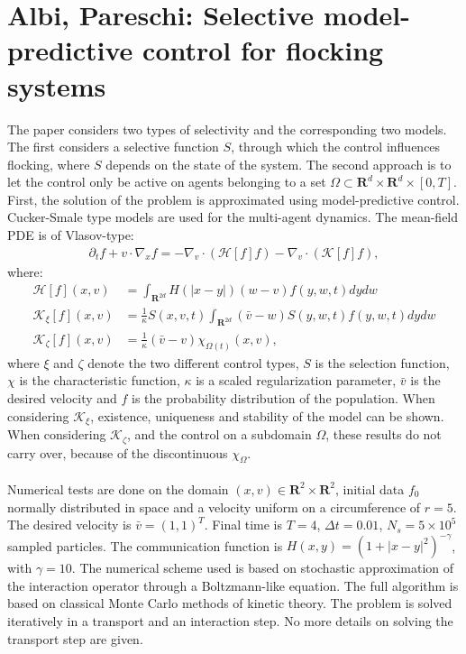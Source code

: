 \documentclass[11pt, a4paper]{article}
\theoremstyle{definition}
\begin{document}
\section{Albi, Pareschi: Selective model-predictive control for flocking systems \cite{albi2016selective}}
The paper considers two types of selectivity and the corresponding two models. The first considers a selective function $S$, through which the control influences flocking, where $S$ depends on the state of the system. The second approach is to let the control only be active on agents belonging to a set $\Omega \subset \mathbf{R}^d \times \mathbf{R}^d \times [0,T]$.\\
First, the solution of the problem is approximated using model-predictive control. Cucker-Smale type models are used for the multi-agent dynamics.
The mean-field PDE is of Vlasov-type:
\begin{align*}
\partial_t f + v \cdot\nabla_x f = - \nabla_v \cdot (\mathcal{H}[f]f)- \nabla_v \cdot (\mathcal{K}[f]f),
\end{align*}
where:
\begin{align*}
\mathcal{H}[f](x,v) &= \int_{\mathbf{R}^{2d}} H(|x-y|)(w-v)f(y,w,t)dy dw\\
\mathcal{K}_\xi[f](x,v) &= \frac{1}{\kappa}S(x,v,t) \int_{\mathbf{R}^{2d}} (\bar v - w) S(y,w,t)f(y,w,t) dy dw\\
\mathcal{K}_\zeta [f](x,v) &= \frac{1}{\kappa}(\bar v - v ) \chi_{\Omega(t)}(x,v),
\end{align*}
where $\xi$ and $\zeta$ denote the two different control types, $S$ is the selection function, $\chi$ is the characteristic function, $\kappa$ is a scaled regularization parameter, $\bar v$ is the desired velocity and $f$ is the probability distribution of the population.
When considering $\mathcal{K}_\xi$, existence, uniqueness and stability of the model can be shown. When considering $\mathcal{K}_\zeta$, and the control on a subdomain $\Omega$, these results do not carry over, because of the discontinuous $\chi_\Omega$.\\
\\
Numerical tests are done on the domain $(x,v) \in \mathbf{R}^2 \times \mathbf{R}^2$, initial data $f_0$ normally distributed in space and a velocity uniform on a circumference of $r=5$. The desired velocity is $\bar v =(1,1)^T$. Final time is $T=4$, $\Delta t=0.01$, $N_s=5 \times 10^5$ sampled particles. The communication function is $H(x,y)=(1+|x-y|^2)^{-\gamma}$, with $\gamma=10$.
The numerical scheme used is based on stochastic approximation of the interaction operator through a Boltzmann-like equation. The full algorithm is based on classical Monte Carlo methods of kinetic theory. The problem is solved iteratively in a transport and an interaction step. No more details on solving the transport step are given.\\
\end{document}
